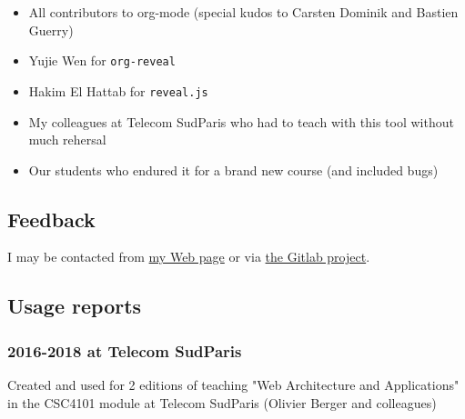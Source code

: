 \documentclass[a4paper]{article}
\begin{document}
\begin{itemize}
\item All contributors to org-mode (special kudos to Carsten Dominik and Bastien Guerry)
\item Yujie Wen for \texttt{org-reveal}
\item Hakim El Hattab for \texttt{reveal.js}
\item My colleagues at Telecom SudParis who had to teach with this tool without much rehersal
\item Our students who endured it for a brand new course (and included bugs)
\end{itemize}

\subsection{Feedback}
\label{sec:org241aa9f}

I may be contacted from \href{http://www-public.tem-tsp.eu/\~berger\_o/\#sec-3}{my Web page} or via \href{https://gitlab.com/olberger/org-teaching}{the Gitlab project}.

\subsection{Usage reports}
\label{sec:org8951589}

\subsubsection{2016-2018 at Telecom SudParis}
\label{sec:orgd6a5ace}

Created and used for 2 editions of teaching "Web Architecture and Applications" in the CSC4101 module at Telecom SudParis (Olivier Berger and colleagues)
\end{document}
